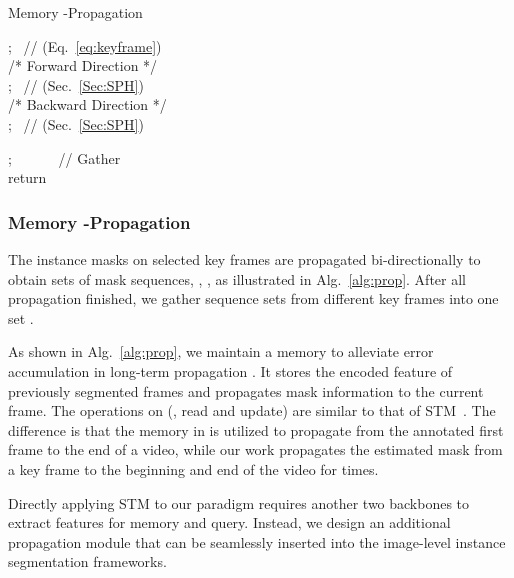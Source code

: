 \documentclass[10pt,twocolumn,letterpaper]{article}
\begin{document}
	\begin{algorithm}[t]\label{alg:prop} 
		\caption{Memory -Propagation} 
		\For{}
		{
			
			; ~\textcolor[rgb]{0.5,0.5,0.5}{\footnotesize // (Eq.~\ref{eq:keyframe})} \\  
\;
			\textcolor[rgb]{0.5,0.5,0.5}{\footnotesize /* Forward Direction */} \\
			\;    
			\For{}
			{
				; ~\textcolor[rgb]{0.5,0.5,0.5}{\footnotesize // (Sec.~\ref{Sec:SPH}) } \\
				\;
			}
			\textcolor[rgb]{0.5,0.5,0.5}{\footnotesize /* Backward Direction */} \\
			\;    
			\For{}
			{
				; ~\textcolor[rgb]{0.5,0.5,0.5}{\footnotesize // (Sec.~\ref{Sec:SPH})} \\
				\;
			}
			\;
			\; 
}
		; ~~~~~~\textcolor[rgb]{0.5,0.5,0.5}{\footnotesize // Gather }  \\
		return \;	
		
	\end{algorithm}
	
	\subsubsection{Memory -Propagation}\label{Sec:MKP}
	The instance masks on  selected key frames are propagated bi-directionally to obtain  sets of mask sequences, \ie, , as illustrated in Alg.~\ref{alg:prop}.  After all propagation finished, we gather  sequence sets from different key frames into one set .
	
	As shown in Alg.~\ref{alg:prop}, we maintain a memory  to alleviate error accumulation in long-term propagation \cite{oh2019video}. It stores the encoded feature of previously segmented frames and propagates mask information to the current frame.
	The operations on  (\eg, read and update) are similar to that of STM~\cite{oh2019video}. The difference is that the memory in \cite{oh2019video} is utilized to propagate from the annotated first frame to the end of a video, while our work propagates the estimated mask from a key frame to the beginning and end of the video for  times. 
	
	Directly applying STM to our paradigm requires another two backbones to extract features for memory and query. 
	Instead, we design an additional propagation module that can be seamlessly inserted into the image-level instance segmentation frameworks.
	
\end{document}
